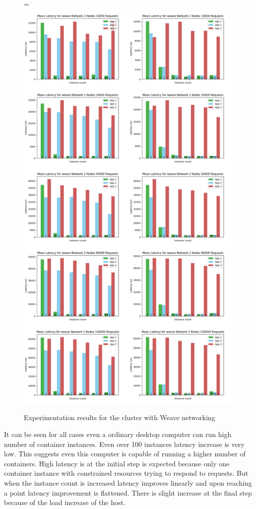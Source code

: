 \documentclass[12pt,oneandhalf,chaparabic,ceng,ms,eng,oneside,pntc]{gsufbe}
\makeatletter
\let\old@includegraphics\includegraphics
\renewcommand{\includegraphics}[2][,]{%
  \setbox9=\hbox{\old@includegraphics[#1]{#2}}%
  \ifdim\wd9>\textwidth
    \old@includegraphics[#1,width=\textwidth]{#2}%
  \else
    \old@includegraphics[#1]{#2}%
  \fi%
}
\makeatother
\begin{document}
\begin{figure}
\centering
\includegraphics[]{weave.png}
\caption{Experimentation results for the cluster with Weave networking}
\label{weave}
\end{figure}

It can be seen for all cases even a ordinary desktop computer can run high number of container
instances.  Even over 100 instances latency increase is very low.  This suggests even this computer is
capable of running a higher number of containers.  High latency is at the initial step is expected 
because only one container instance with constrained resources trying to respond to requests.  But when
the instance count is increased latency improves linearly and upon reaching a point latency improvement
is flattened.  There is slight increase at the final step because of the load increase of the host.
\end{document}
